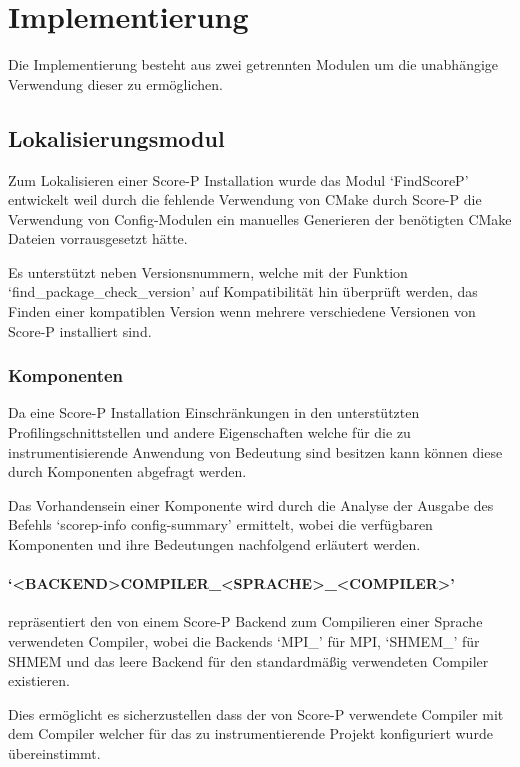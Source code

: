 \documentclass[german,proseminar,hyperref,utf8]{zihpub}
\begin{document}
    \newpage
    \section{Implementierung}
    Die Implementierung besteht aus zwei getrennten Modulen um die unabhängige Verwendung dieser
    zu ermöglichen.

    \subsection{Lokalisierungsmodul}
    Zum Lokalisieren einer Score-P Installation wurde das Modul `FindScoreP' entwickelt weil
    durch die fehlende Verwendung von CMake durch Score-P die Verwendung von Config-Modulen
    ein manuelles Generieren der benötigten CMake Dateien vorrausgesetzt hätte.

    Es unterstützt neben Versionsnummern, welche mit der Funktion `find\_package\_check\_version'
    auf Kompatibilität hin überprüft werden, das Finden einer kompatiblen Version wenn
    mehrere verschiedene Versionen von Score-P installiert sind.

    \subsubsection{Komponenten}
    Da eine Score-P Installation Einschränkungen in den unterstützten Profilingschnittstellen und
    andere Eigenschaften welche für die zu instrumentisierende Anwendung von Bedeutung sind besitzen
    kann können diese durch Komponenten abgefragt werden.

    Das Vorhandensein einer Komponente wird durch die Analyse der Ausgabe des Befehls
    `scorep-info config-summary' ermittelt, wobei die verfügbaren Komponenten und ihre
    Bedeutungen nachfolgend erläutert werden.

    \paragraph{`<BACKEND>COMPILER\_<SPRACHE>\_<COMPILER>'} repräsentiert den von einem Score-P Backend
    zum Compilieren einer Sprache verwendeten Compiler, wobei die Backends `MPI\_' für MPI,
    `SHMEM\_' für SHMEM und das leere Backend für den standardmä{\ss}ig verwendeten Compiler existieren.

    Dies ermöglicht es sicherzustellen dass der von Score-P verwendete Compiler mit dem Compiler
    welcher für das zu instrumentierende Projekt konfiguriert wurde übereinstimmt.
\end{document}
